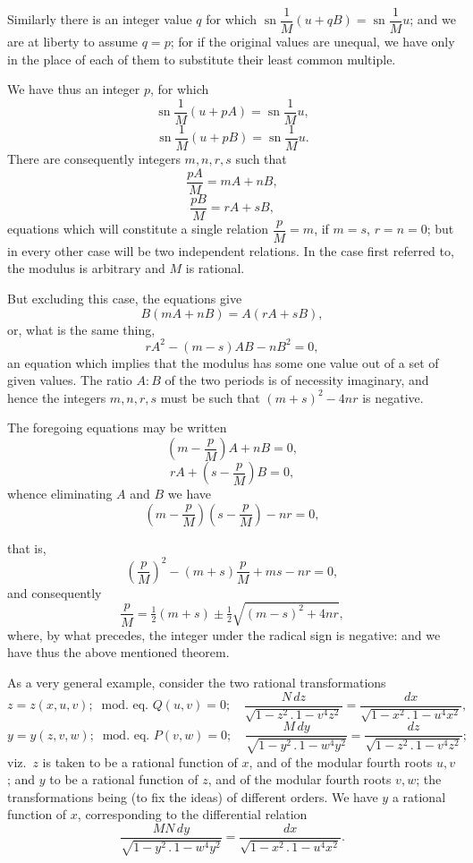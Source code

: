 \documentclass[11pt,a4paper]{article}
\providecommand{\sn}{\operatorname{sn}}
\begin{document}
Similarly there is an integer value $q$ for which $\sn\dfrac{1}{M}(u + qB) = \sn\dfrac{1}{M}u$; and we are at liberty to assume $q = p$; for if the original values are unequal, we have only in the place of each of them to substitute their least common multiple.

We have thus an integer $p$, for which
\[
\sn\dfrac{1}{M}(u + pA) = \sn\dfrac{1}{M}u,
\]
\[
\sn\dfrac{1}{M}(u + pB) = \sn\dfrac{1}{M}u.
\]
There are consequently integers $m, n, r, s$ such that
\[
\frac{pA}{M} = mA + nB,
\]
\[
\frac{pB}{M} = rA + sB,
\]
equations which will constitute a single relation $\dfrac{p}{M} = m$, if $m = s$, $r = n = 0$; but in every other case will be two independent relations. In the case first referred to, the modulus is arbitrary and $M$ is rational.

But excluding this case, the equations give
\[
B(mA + nB) = A(rA + sB),
\]
or, what is the same thing,
\[
rA^{2} - (m - s)AB - nB^{2} = 0,
\]
an equation which implies that the modulus has some one value out of a set of given values. The ratio $A : B$ of the two periods is of necessity imaginary, and hence the integers $m, n, r, s$ must be such that $(m + s)^{2} - 4nr$ is negative.

The foregoing equations may be written
\[
\left(m - \frac{p}{M}\right)A + nB = 0,
\]
\[
rA + \left(s - \frac{p}{M}\right)B = 0,
\]
whence eliminating $A$ and $B$ we have
\[
\left(m - \frac{p}{M}\right)\!\left(s - \frac{p}{M}\right) - nr = 0,
\]

\newpage


that is,
\[
\left(\frac{p}{M}\right)^{2} - (m + s)\frac{p}{M} + ms - nr = 0,
\]
and consequently
\[
\frac{p}{M} = \tfrac{1}{2}(m + s) \pm \tfrac{1}{2}\sqrt{(m - s)^{2} + 4nr},
\]
where, by what precedes, the integer under the radical sign is negative: and we have thus the above mentioned theorem.

As a very general example, consider the two rational transformations
\[
z = z(x, u, v); \;\; \text{mod.\ eq.\ } Q(u, v) = 0; \quad \frac{N\,dz}{\sqrt{1 - z^{2}\,.\,1 - v^{4}z^{2}}} = \frac{dx}{\sqrt{1 - x^{2}\,.\,1 - u^{4}x^{2}}},
\]
\[
y = y(z, v, w); \;\; \text{mod.\ eq.\ } P(v, w) = 0; \quad \frac{M\,dy}{\sqrt{1 - y^{2}\,.\,1 - w^{4}y^{2}}} = \frac{dz}{\sqrt{1 - z^{2}\,.\,1 - v^{4}z^{2}}};
\]
viz.\ $z$ is taken to be a rational function of $x$, and of the modular fourth roots $u, v$; and $y$ to be a rational function of $z$, and of the modular fourth roots $v, w$; the transformations being (to fix the ideas) of different orders. We have $y$ a rational function of $x$, corresponding to the differential relation
\[
\frac{MN\,dy}{\sqrt{1 - y^{2}\,.\,1 - w^{4}y^{2}}} = \frac{dx}{\sqrt{1 - x^{2}\,.\,1 - u^{4}x^{2}}}.
\]
\end{document}
